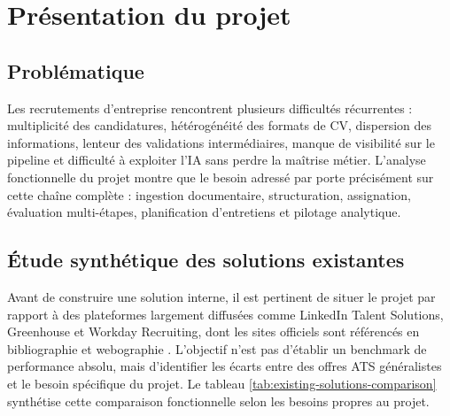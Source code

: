 \section{Présentation du projet}

\subsection{Problématique}
Les recrutements d'entreprise rencontrent plusieurs difficultés récurrentes : multiplicité des candidatures, hétérogénéité des formats de CV, dispersion des informations, lenteur des validations intermédiaires, manque de visibilité sur le pipeline et difficulté à exploiter l'IA sans perdre la maîtrise métier. L'analyse fonctionnelle du projet montre que le besoin adressé par \projectname{} porte précisément sur cette chaîne complète : ingestion documentaire, structuration, assignation, évaluation multi-étapes, planification d'entretiens et pilotage analytique.

\subsection{Étude synthétique des solutions existantes}
Avant de construire une solution interne, il est pertinent de situer le projet par rapport à des plateformes largement diffusées comme LinkedIn Talent Solutions, Greenhouse et Workday Recruiting, dont les sites officiels sont référencés en bibliographie et webographie . L'objectif n'est pas d'établir un benchmark de performance absolu, mais d'identifier les écarts entre des offres ATS généralistes et le besoin spécifique du projet.
Le tableau \ref{tab:existing-solutions-comparison} synthétise cette comparaison fonctionnelle selon les besoins propres au projet.

